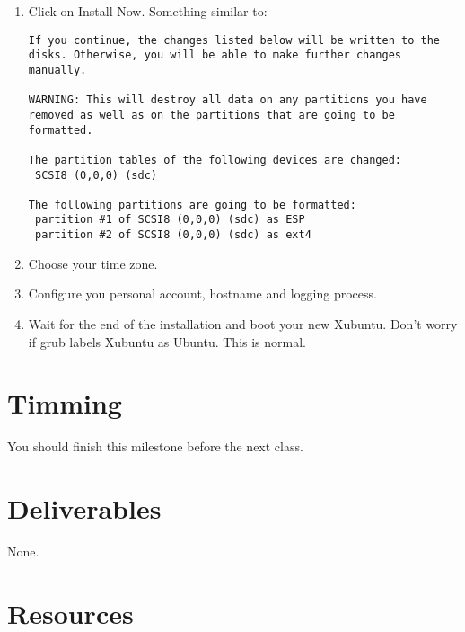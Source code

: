 \begin{enumerate}
\item Click on Install Now. Something similar to:

\begin{verbatim}
If you continue, the changes listed below will be written to the disks. Otherwise, you will be able to make further changes manually.

WARNING: This will destroy all data on any partitions you have removed as well as on the partitions that are going to be formatted.

The partition tables of the following devices are changed:
 SCSI8 (0,0,0) (sdc)

The following partitions are going to be formatted:
 partition #1 of SCSI8 (0,0,0) (sdc) as ESP
 partition #2 of SCSI8 (0,0,0) (sdc) as ext4
\end{verbatim}

\item Choose your time zone.
  
\item Configure you personal account, hostname and logging process.
  
\item Wait for the end of the installation and boot your new
  Xubuntu. Don't worry if grub labels Xubuntu as Ubuntu. This is
  normal.
  
\end{enumerate}

\section{Timming}

You should finish this milestone before the next class.

\section{Deliverables}

None.

\section{Resources}


